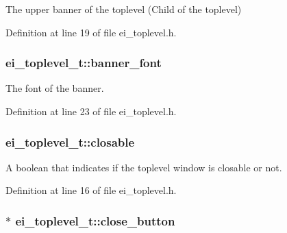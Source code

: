 The upper banner of the toplevel (Child of the toplevel) 



Definition at line 19 of file ei\+\_\+toplevel.\+h.

\hypertarget{structei__toplevel__t_a7d5368e56c6d56ae26536bce28499b32}{
\subsubsection[{banner\+\_\+font}]{ ei\+\_\+toplevel\+\_\+t\+::banner\+\_\+font}}\label{structei__toplevel__t_a7d5368e56c6d56ae26536bce28499b32}


The font of the banner. 



Definition at line 23 of file ei\+\_\+toplevel.\+h.

\hypertarget{structei__toplevel__t_a462595f505435050c9e1362fedd71fe5}{
\subsubsection[{closable}]{ ei\+\_\+toplevel\+\_\+t\+::closable}}\label{structei__toplevel__t_a462595f505435050c9e1362fedd71fe5}


A boolean that indicates if the toplevel window is closable or not. 



Definition at line 16 of file ei\+\_\+toplevel.\+h.

\hypertarget{structei__toplevel__t_a4efd970ca149d9e9f8e5d8dcabd5441b}{
\subsubsection[{close\+\_\+button}]{$\ast$ ei\+\_\+toplevel\+\_\+t\+::close\+\_\+button}}\label{structei__toplevel__t_a4efd970ca149d9e9f8e5d8dcabd5441b}


